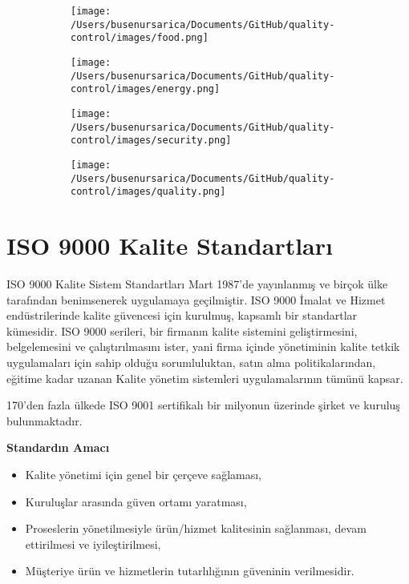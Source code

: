 \documentclass[
]{book}
\providecommand{\tightlist}{%
  \setlength{\itemsep}{0pt}\setlength{\parskip}{0pt}}
\begin{document}
\begin{figure}
\begin{subfigure}[h]{0.5\linewidth}
\texttt{[image: /Users/busenursarica/Documents/GitHub/quality-control/images/food.png]}
\end{subfigure}
\hfill
\begin{subfigure}[h]{0.5\linewidth}
\texttt{[image: /Users/busenursarica/Documents/GitHub/quality-control/images/energy.png]}
\end{subfigure}%
\end{figure}

\begin{figure}
\begin{subfigure}[h]{0.5\linewidth}
\texttt{[image: /Users/busenursarica/Documents/GitHub/quality-control/images/security.png]}
\end{subfigure}
\hfill
\begin{subfigure}[h]{0.5\linewidth}
\texttt{[image: /Users/busenursarica/Documents/GitHub/quality-control/images/quality.png]}
\end{subfigure}%
\end{figure}


\hypertarget{iso-9000-kalite-standartlarux131}{%
\section{ISO 9000 Kalite Standartları}\label{iso-9000-kalite-standartlarux131}}

ISO 9000 Kalite Sistem Standartları Mart 1987'de yayınlanmış ve birçok ülke tarafından benimsenerek uygulamaya geçilmiştir. ISO 9000 İmalat ve Hizmet endüstrilerinde kalite güvencesi için kurulmuş, kapsamlı bir standartlar kümesidir. ISO 9000 serileri, bir firmanın kalite sistemini geliştirmesini, belgelemesini ve çalıştırılmasını ister, yani firma içinde yönetiminin kalite tetkik uygulamaları için sahip olduğu sorumluluktan, satın alma politikalarından, eğitime kadar uzanan Kalite yönetim sistemleri uygulamalarının tümünü kapsar.

170'den fazla ülkede ISO 9001 sertifikalı bir milyonun üzerinde şirket ve kuruluş bulunmaktadır.

\textbf{Standardın Amacı}

\begin{itemize}
\tightlist
\item
  Kalite yönetimi için genel bir çerçeve sağlaması,
\item
  Kuruluşlar arasında güven ortamı yaratması,
\item
  Proseslerin yönetilmesiyle ürün/hizmet kalitesinin sağlanması, devam ettirilmesi ve iyileştirilmesi,
\item
  Müşteriye ürün ve hizmetlerin tutarlılığının güveninin verilmesidir.
\end{itemize}
\end{document}
